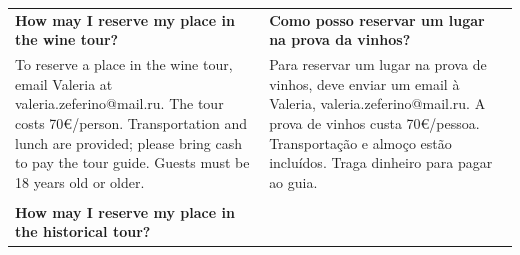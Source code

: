 \documentclass[6pt]{article}
\begin{document}
\pagestyle{empty}

\begin{tabular}{p{2.25in}|p{2.25in}}
{\bf How may I reserve my place in the wine tour?} & {\bf Como posso reservar um lugar na prova da vinhos?}\\
  To reserve a place in the wine tour, email Valeria at valeria.zeferino@mail.ru. The tour costs 70\euro{}/person. Transportation and lunch are provided; please bring cash to pay the tour guide. Guests must be 18 years old or older. 
&
Para reservar um lugar na prova de vinhos, deve enviar um email à Valeria, valeria.zeferino@mail.ru. A prova de vinhos custa 70\euro{}/pessoa. Transportação e almoço estão incluídos. Traga dinheiro para pagar ao guia.\\
&\\
{\bf How may I reserve my place in the historical tour?} 
\end{tabular}
\end{document}
